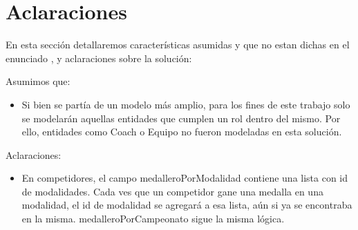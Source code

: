 \section{Aclaraciones}

En esta secci\'on detallaremos características asumidas y que no estan dichas en el enunciado , y aclaraciones sobre la solución:

Asumimos que:

\begin{itemize}

\item Si bien se partía de un modelo más amplio, para los fines de este trabajo solo se modelarán aquellas entidades que cumplen un rol dentro del mismo. Por ello, entidades como Coach o Equipo no fueron modeladas en esta solución.

\end{itemize}

Aclaraciones:

\begin{itemize}

\item En competidores, el campo medalleroPorModalidad contiene una lista con id de modalidades. Cada ves que un competidor gane una medalla en una modalidad, el id de modalidad se agregará a esa lista, aún si ya se encontraba en la misma. medalleroPorCampeonato sigue la misma lógica.

\end{itemize}


